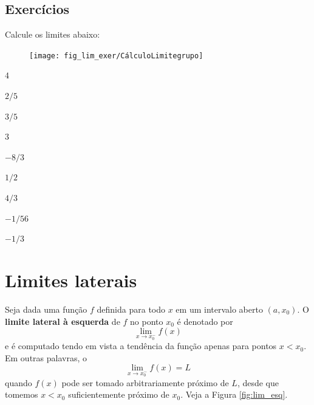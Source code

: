 \cleardoublepage\documentclass[../main.tex]{subfiles}
\begin{document}
\subsection{Exercícios}
\begin{exer}
  Calcule os limites abaixo:
  \begin{figure}[H]
  \centering
  \texttt{[image: fig\_lim\_exer/CálculoLimitegrupo]}
\end{figure}
\end{exer}
\begin{resp}
\begin{multicols}{3}
\begin{compactenum}[a)]
\item $4$
\item $2/5$
\item $3/5$
\item $3$
\item $-8/3$
\item $1/2$
\item $4/3$
\item $-1/56$
\item $-1/3$
\end{compactenum}
\end{multicols}
 \end{resp}
 
\section{Limites laterais}\hypertarget{LimLateral}{}\label{cap_lim_sec_lateral}
Seja dada uma função $f$ definida para todo $x$ em um intervalo aberto $(a, x_0)$. O {\bf limite lateral à esquerda} de $f$ no ponto $x_0$ é denotado por
\begin{equation*}
  \lim_{x\to x_0^-} f(x)
\end{equation*}
e é computado tendo em vista a tendência da função apenas para pontos $x<x_0$. Em outras palavras, o
\begin{equation*}
  \lim_{x\to x_0^-} f(x) = L
\end{equation*}
quando $f(x)$ pode ser tomado arbitrariamente próximo de $L$, desde que tomemos $x<x_0$ suficientemente próximo de $x_0$. Veja a Figura \ref{fig:lim_esq}.
\end{document}
